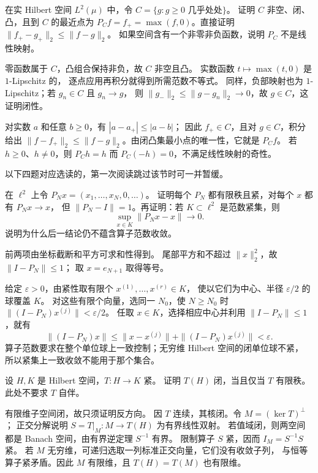 \begin{exercise}\label{b1:ex:08-positive-cone-projection}
在实 Hilbert 空间 \(L^2(\mu)\) 中，令%
\(C=\{g:g\geq0\text{ 几乎处处}\}\)。
证明 \(C\) 非空、闭、凸，且到 \(C\) 的最近点为%
\(P_Cf=f_+=\max(f,0)\)。直接证明 \(\|f_+-g_+\|_2\leq\|f-g\|_2\)。
如果空间含有一个非零非负函数，说明 \(P_C\) 不是线性映射。
\end{exercise}
\begin{solution}
零函数属于 \(C\)，凸组合保持非负，故 \(C\) 非空且凸。
实数函数 \(t\mapsto\max(t,0)\) 是 \(1\)-Lipschitz 的，
逐点应用再积分就得到所需范数不等式。
同样，负部映射也为 \(1\)-Lipschitz；若 \(g_n\in C\) 且 \(g_n\to g\)，
则 \(\|g_-\|_2\leq\|g-g_n\|_2\to0\)，故 \(g\in C\)，这证明闭性。

对实数 \(a\) 和任意 \(b\geq0\)，有 \(|a-a_+|\leq|a-b|\)；
因此 \(f_+\in C\)，且对 \(g\in C\)，积分给出%
\(\|f-f_+\|_2\leq\|f-g\|_2\)。由闭凸集最小点的唯一性，它就是 \(P_Cf\)。
若 \(h\geq0\)、\(h\ne0\)，则 \(P_Ch=h\) 而 \(P_C(-h)=0\)，不满足线性映射的奇性。
\end{solution}

以下四题对应选读的，第一次阅读跳过该节时可一并暂缓。

\begin{optionalexercise}\label{b1:ex:08-strong-finite-rank}
在 \(\ell^2\) 上令 \(P_Nx=(x_1,\ldots,x_N,0,\ldots)\)。
证明每个 \(P_N\) 都有限秩且紧，对每个 \(x\) 都有 \(P_Nx\to x\)，
但 \(\|P_N-I\|=1\)。再证明：若 \(K\subset\ell^2\) 是范数紧集，则
\[
 \sup_{x\in K}\|P_Nx-x\|\longrightarrow0.
\]
说明为什么后一结论仍不蕴含算子范数收敛。
\end{optionalexercise}
\begin{solution}
前两项由坐标截断和平方可求和性得到。
尾部平方和不超过 \(\|x\|_2^2\)，故 \(\|I-P_N\|\leq1\)；
取 \(x=e_{N+1}\) 取得等号。

给定 \(\varepsilon>0\)，由紧性取有限个 \(x^{(1)},\ldots,x^{(r)}\in K\)，
使以它们为中心、半径 \(\varepsilon/2\) 的球覆盖 \(K\)。
对这些有限个向量，选同一 \(N_0\)，使 \(N\geq N_0\) 时%
\(\|(I-P_N)x^{(j)}\|<\varepsilon/2\)。
任取 \(x\in K\)，选择相应中心并利用 \(\|I-P_N\|\leq1\)，就有
\[
 \|(I-P_N)x\|
 \leq\|x-x^{(j)}\|+\|(I-P_N)x^{(j)}\|<\varepsilon.
\]
算子范数要求在整个单位球上一致控制；无穷维 Hilbert 空间的闭单位球不紧，
所以紧集上一致收敛不能用于那个集合。
\end{solution}

\begin{optionalexercise}\label{b1:ex:08-compact-closed-range}
设 \(H,K\) 是 Hilbert 空间，\(T:H\to K\) 紧。
证明 \(T(H)\) 闭，当且仅当 \(T\) 有限秩。此处不要求 \(T\) 自伴。
\end{optionalexercise}
\begin{solution}
有限维子空间闭，故只须证明反方向。
因 \(T\) 连续，其核闭。令 \(M=(\ker T)^\perp\)；
正交分解说明 \(S=T|_M:M\to T(H)\) 为有界线性双射。
若值域闭，则两空间都是 Banach 空间，由有界逆定理 \(S^{-1}\) 有界。
限制算子 \(S\) 紧，因而 \(I_M=S^{-1}S\) 紧。
若 \(M\) 无穷维，可递归选取一列标准正交向量，它们没有收敛子列，
与恒等算子紧矛盾。因此 \(M\) 有限维，且 \(T(H)=T(M)\) 也有限维。
\end{solution}

